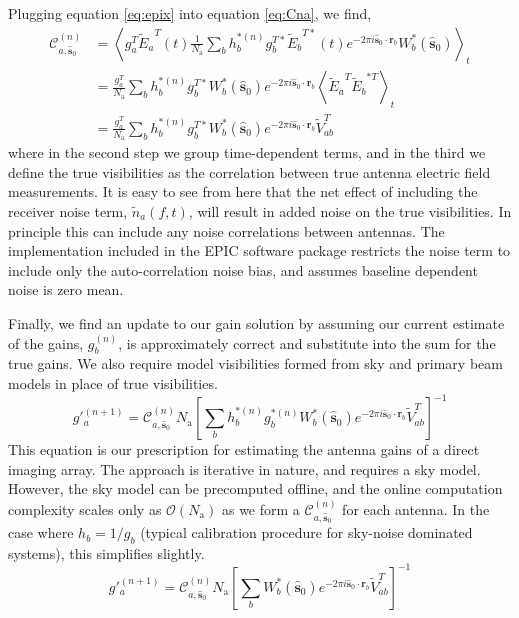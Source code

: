 \documentclass[a4paper,fleqn,usenatbib]{../mnras}
\newcommand{\Nant}{\ensuremath{N_{\mathrm{a}}}}
\newcommand{\spix}{\ensuremath{\hat{\mathbf{s}}_{0}}}
\newcommand{\Cna}[1][n]{\ensuremath{\mathcal{C}^{(#1)}_{a,\spix}}}
\newcommand{\rb}{\ensuremath{\mathbf{r}_b}}
\newcommand{\beamtheta}{\ensuremath{W}}
\newcommand{\Er}[1]{\ensuremath{\widetilde{E}_{#1}}}
\newcommand{\V}{\ensuremath{\widetilde{V}}}
\begin{document}
Plugging equation \ref{eq:epix} into equation \ref{eq:Cna}, we find,
\begin{align}\label{eq:cna}
\Cna & = \left<g^T_a \Er{a}^T(t) \frac{1}{\Nant} \sum_b h^{*(n)}_b g^{T*}_b\Er{b}^{T*}(t) e^{-2\pi i \spix \cdot \rb} \beamtheta^*_b(\spix)\right>_t \nonumber \\
& = \frac{g^T_a}{\Nant} \sum_b h^{*(n)}_b g^{T*}_b \beamtheta^*_b(\spix) e^{-2\pi i \spix \cdot \rb} \left<\Er{a}^T \Er{b}^{*T} \right>_t \nonumber \\
& = \frac{g^T_a}{\Nant} \sum_b h^{*(n)}_b g^{T*}_b \beamtheta^*_b(\spix) e^{-2\pi i \spix \cdot \rb} \V^T_{ab}
\end{align}
where in the second step we group time-dependent terms, and in the third we define the true visibilities as the correlation between true antenna electric field measurements. It is easy to see from here that the net effect of including the receiver noise term, $\widetilde{n}_a(f,t)$, will result in added noise on the true visibilities. In principle this can include any noise correlations between antennas. The implementation included in the EPIC software package restricts the noise term to include only the auto-correlation noise bias, and assumes baseline dependent noise is zero mean.

Finally, we find an update to our gain solution by assuming our current estimate of the gains, $g^{(n)}_b$, is approximately correct and substitute into the sum for the true gains. We also require model visibilities formed from sky and primary beam models in place of true visibilities.
\begin{equation}\label{eq:cal_solution}
g'^{(n+1)}_a = \Cna \Nant \left[ \sum_b h^{*(n)}_b g^{*(n)}_b \beamtheta^*_b(\spix) e^{-2\pi i \spix \cdot \rb} \V^T_{ab} \right]^{-1}
\end{equation}
This equation is our prescription for estimating the antenna gains of a direct imaging array. The approach is iterative in nature, and requires a sky model. However, the sky model can be precomputed offline, and the online computation complexity scales only as $\mathcal{O}(\Nant)$ as we form a $\Cna$ for each antenna. In the case where $h_b = 1/g_b$ (typical calibration procedure for sky-noise dominated systems), this simplifies slightly.
\begin{equation}\label{eq:cal_solution_simple}
g'^{(n+1)}_a = \Cna \Nant \left[ \sum_b \beamtheta^*_b(\spix) e^{-2\pi i \spix \cdot \rb} \V^T_{ab} \right]^{-1}
\end{equation}
\end{document}
